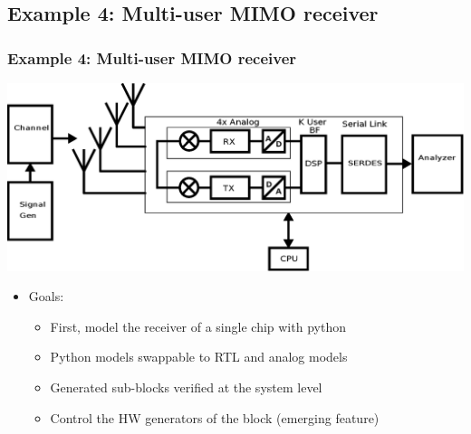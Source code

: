 \documentclass{sdkslides}
\begin{document}

\renewcommand{\sectionname}{Example 4: Multi-user MIMO receiver}
\subsection*{\sectionname}
\begin{frame}[t]
    \frametitle{\sectionname}
    \begin{center}
        \includegraphics[width=\textwidth]{Pics/Fader2_simulator.eps}
    \end{center}
    \begin{itemize}
        \item Goals:
            \begin{itemize}
                \item  First, model the receiver of a single chip with python
                \item  Python models swappable to RTL and analog models 
                \item  Generated sub-blocks verified at the system level
                \item  Control the HW generators of the block (emerging feature)
            \end{itemize}

    \end{itemize}
\end{frame}
\renewcommand{\sectionname}{DSP modeling example}
\end{document}
